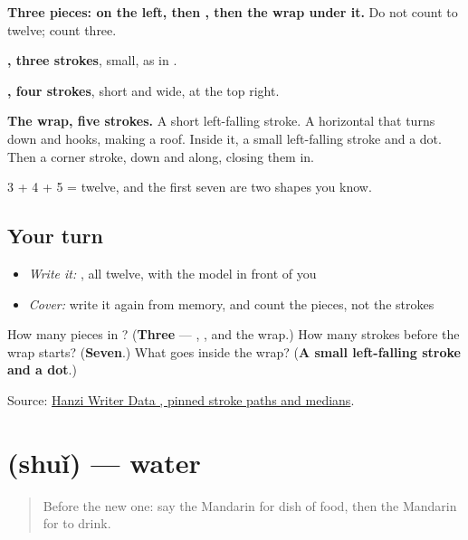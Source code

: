 \begin{quote}
\end{quote}

\textbf{Three pieces:  on the left, then , then the wrap under it.} Do not count to twelve; count three.

\textbf{, three strokes}, small, as in .

\textbf{, four strokes}, short and wide, at the top right.

\textbf{The wrap, five strokes.} A short left-falling stroke. A horizontal that turns down and hooks, making a roof. Inside it, a small left-falling stroke and a dot. Then a corner stroke, down and along, closing them in.

3 + 4 + 5 = twelve, and the first seven are two shapes you know.

\subsection*{Your turn}
\begin{itemize}
\raggedright
  \item \emph{Write it:} , all twelve, with the model in front of you
  \item \emph{Cover:} write it again from memory, and count the pieces, not the strokes
\end{itemize}

\begin{tcolorbox}[breakable,colback=teal!4,colframe=teal!35!black,title={Before you move on}]
How many pieces in ? (\textbf{Three} — , , and the wrap.) How many strokes before the wrap starts? (\textbf{Seven}.) What goes inside the wrap? (\textbf{A small left-falling stroke and a dot}.)

Source: \href{https://raw.githubusercontent.com/chanind/hanzi-writer-data/68d10a4b21150cae5e1ebbd223eed289cf32d90c/data/\%E5\%96\%9D.json}{Hanzi Writer Data , pinned stroke paths and medians}.
\end{tcolorbox}
\section[\texorpdfstring{\zh{水} (shuǐ)}{水 (shuǐ)}]{ (shuǐ) — water}

\label{lesson:ZH-C39-shui}



\begin{quote}
Before the new one: say the Mandarin for dish of food, then the Mandarin for to drink.
\end{quote}

